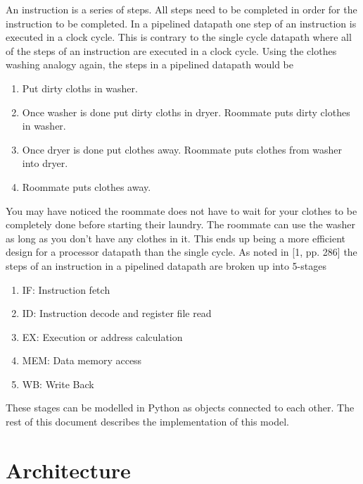 \documentclass[conference]{IEEEtran}
\begin{document}
An instruction is a series of steps.  All steps need to be completed in order for the instruction to be completed.  In a pipelined datapath one step of an instruction is executed in a clock cycle.  This is contrary to the single cycle datapath where all of the steps of an instruction are executed in a clock cycle.  Using the clothes washing analogy again, the steps in a pipelined datapath would be
\begin{enumerate}
    \item Put dirty cloths in washer.
    \item Once washer is done put dirty cloths in dryer.  Roommate puts dirty clothes in washer.
    \item Once dryer is done put clothes away.  Roommate puts clothes from washer into dryer.
    \item Roommate puts clothes away.
\end{enumerate}
You may have noticed the roommate does not have to wait for your clothes to be completely done before starting their laundry.  The roommate can use the washer as long as you don't have any clothes in it.  This ends up being a more efficient design for a processor datapath than the single cycle.
As noted in [1, pp. 286] the steps of an instruction in a pipelined datapath are broken up into 5-stages
\begin{enumerate}
\item IF: Instruction fetch
\item ID: Instruction decode and register file read
\item EX: Execution or address calculation
\item MEM: Data memory access
\item WB: Write Back
\end{enumerate}
These stages can be modelled in Python as objects connected to each other.  The rest of this document describes the implementation of this model.

\section{Architecture}
\end{document}
